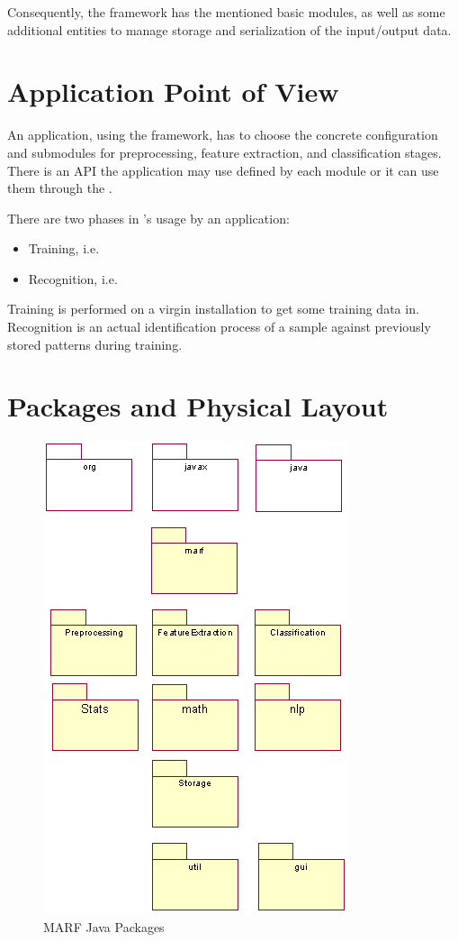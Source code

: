 Consequently, the framework has the mentioned basic modules,
as well as some additional entities to manage storage
and serialization of the input/output data.

\section{Application Point of View}

An application, using the framework, has to choose
the concrete configuration and submodules for preprocessing,
feature extraction, and classification stages. There is an API the application
may use defined by each module or it can use them through the {\marf}.

There are two phases in {\marf}'s usage by an application:

\begin{itemize}
	\item Training, i.e. 
	\item Recognition, i.e. 
\end{itemize}

Training is performed on a virgin {\marf} installation to get
some training data in. Recognition is an actual identification process of a sample
against previously stored patterns during training.

\section{Packages and Physical Layout}

\begin{figure}
	\centering
	\includegraphics{../graphics/arch/packages.png}
	\caption{MARF Java Packages}
	\label{fig:packages}
\end{figure}


